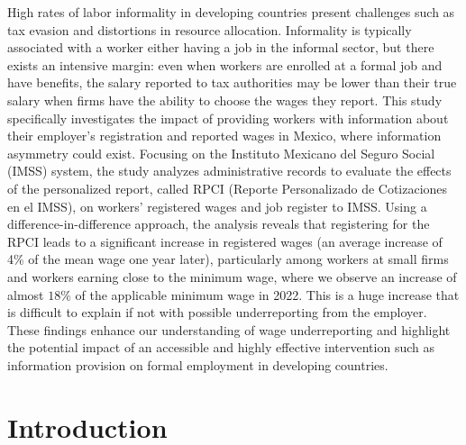 \documentclass[10pt, oneside]{book}
\begin{document}
\noindent High rates of labor informality in developing countries present challenges such as tax evasion and distortions in resource allocation. Informality is typically associated with a worker either having a job in the informal sector, but there exists an intensive margin: even when workers are enrolled at a formal job and have benefits, the salary reported to tax authorities may be lower than their true salary when firms have the ability to choose the wages they report. This study specifically investigates the impact of providing workers with information about their employer's registration and reported wages in Mexico, where information asymmetry could exist. Focusing on the Instituto Mexicano del Seguro Social (IMSS) system, the study analyzes administrative records to evaluate the effects of the personalized report, called RPCI (Reporte Personalizado de Cotizaciones en el IMSS), on workers' registered wages and job register to IMSS. Using a difference-in-difference approach, the analysis reveals that registering for the RPCI leads to a significant increase in registered wages (an average increase of 4\% of the mean wage one year later), particularly among workers at small firms and workers earning close to the minimum wage, where we observe an increase of almost $18\%$ of the applicable minimum wage in 2022. This is a huge increase that is difficult to explain if not with possible underreporting from the employer. These findings enhance our understanding of wage underreporting and highlight the potential impact of an accessible and highly effective intervention such as information provision on formal employment in developing countries.

\pagestyle{plain}
\newpage
\noindent 


\tableofcontents


\mainmatter %

\pagestyle{plain}

\chapter{Introduction}
\end{document}
